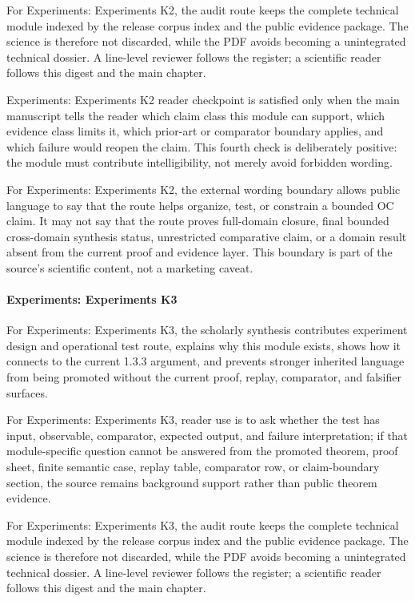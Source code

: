 For Experiments: Experiments K2, the audit route keeps the complete technical module indexed by the release corpus index and the public evidence package. The science is therefore not discarded, while the PDF avoids becoming a unintegrated technical dossier. A line-level reviewer follows the register; a scientific reader follows this digest and the main chapter.


Experiments: Experiments K2 reader checkpoint is satisfied only when the main manuscript tells the reader which claim class this module can support, which evidence class limits it, which prior-art or comparator boundary applies, and which failure would reopen the claim. This fourth check is deliberately positive: the module must contribute intelligibility, not merely avoid forbidden wording.


For Experiments: Experiments K2, the external wording boundary allows public language to say that the route helps organize, test, or constrain a bounded OC claim. It may not say that the route proves full-domain closure, final bounded cross-domain synthesis status, unrestricted comparative claim, or a domain result absent from the current proof and evidence layer. This boundary is part of the source's scientific content, not a marketing caveat.


\paragraph{Experiments: Experiments K3}

For Experiments: Experiments K3, the scholarly synthesis contributes experiment design and operational test route, explains why this module exists, shows how it connects to the current 1.3.3 argument, and prevents stronger inherited language from being promoted without the current proof, replay, comparator, and falsifier surfaces.


For Experiments: Experiments K3, reader use is to ask whether the test has input, observable, comparator, expected output, and failure interpretation; if that module-specific question cannot be answered from the promoted theorem, proof sheet, finite semantic case, replay table, comparator row, or claim-boundary section, the source remains background support rather than public theorem evidence.


For Experiments: Experiments K3, the audit route keeps the complete technical module indexed by the release corpus index and the public evidence package. The science is therefore not discarded, while the PDF avoids becoming a unintegrated technical dossier. A line-level reviewer follows the register; a scientific reader follows this digest and the main chapter.


